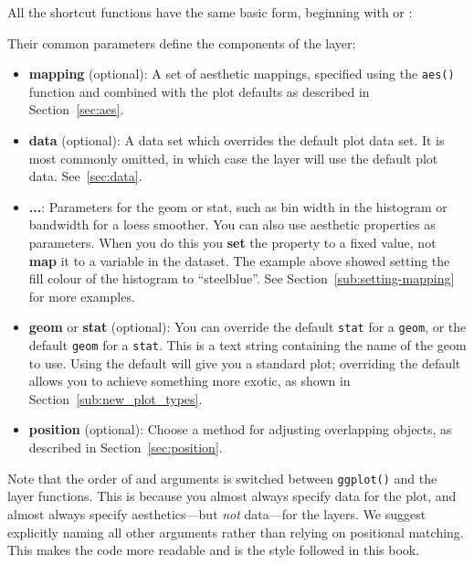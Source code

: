 \noindent All the shortcut functions have the same basic form, beginning with  or :

% 

\noindent Their common parameters define the components of the layer:

\begin{itemize}
  \item {\bf mapping} (optional): A set of aesthetic mappings, specified using the {\tt aes()} function and combined with the plot defaults as described in Section~\ref{sec:aes}.

  \item {\bf data} (optional): A data set which overrides the default plot data set.  It is most commonly omitted, in which case the layer will use the default plot data. See~\ref{sec:data}.
  
  \item {\bf ...}: Parameters for the geom or stat, such as bin width in the histogram or bandwidth for a loess smoother.  You can also use aesthetic properties as parameters.  When you do this you \textbf{set} the property to a fixed value,  not \textbf{map} it to a variable in the dataset.  The example above showed setting the fill colour of the histogram to ``steelblue''. See Section~\ref{sub:setting-mapping} for more examples.
  
  \item {\bf geom} or {\bf stat} (optional):  You can override the default {\tt stat} for a {\tt geom}, or the default {\tt geom} for a {\tt stat}.  This is a text string containing the name of the geom to use.  Using the default will give you a standard plot; overriding the default allows you to achieve something more exotic, as shown in Section~\ref{sub:new_plot_types}.

  \item {\bf position} (optional): Choose a method for adjusting overlapping objects, as described in Section~\ref{sec:position}.
  
\end{itemize}

Note that the order of  and  arguments is switched between {\tt ggplot()} and the layer functions.  This is because you almost always specify data for the plot, and almost always specify aesthetics---but {\em not} data---for the layers.  We suggest explicitly naming all other arguments rather than relying on positional matching.  This makes the code more readable and is the style followed in this book.

